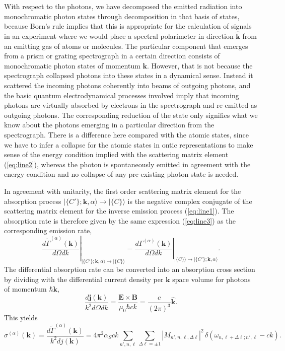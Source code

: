 \documentclass[final,3p,12pt]{elsarticle3}
\begin{document}
With respect to the photons, we have decomposed the emitted radiation into 
monochromatic photon states through decomposition in that basis of states, 
because Born's rule implies that this is appropriate for the calculation 
of signals in an experiment 
where we would place a spectral polarimeter in direction $\hat{\bm{k}}$ from 
an emitting gas of atoms or molecules. The particular component that emerges from 
a prism or grating spectrograph in a certain direction consists of monochromatic 
photon states of momentum $\bm{k}$. However, that is not because the 
spectrograph collapsed photons into these states in a dynamical sense. 
Instead it scattered the incoming photons coherently into beams of outgoing photons, 
and the basic quantum electrodynamical processes involved imply that incoming photons 
are virtually absorbed by electrons in the spectrograph and re-emitted as outgoing 
photons. The corresponding reduction of the state only signifies what we know about 
the photons emerging in a particular direction from the spectrograph.
There is a difference here compared with the atomic states, since we have to
infer a collapse for the atomic states in ontic representations to make
sense of the energy condition implied with the scattering matrix element (\ref{eq:line2}), 
whereas the photon is spontaneously emitted in agreement with the energy 
condition and no collapse of any pre-existing photon state is needed.

In agreement with unitarity, the first order scattering matrix element for the 
absorption process $\bm{|}\{C'\};\bm{k},\alpha\bm{\rangle}\to\bm{|}\{C\}\bm{\rangle}$
is the negative complex conjugate of the scattering matrix element for the 
inverse emission process (\ref{eq:line1}). The absorption rate is therefore 
given by the same expression (\ref{eq:line3}) as the corresponding emission rate,
\[
\left.\frac{d\tilde{\Gamma}^{(\alpha)}(\bm{k})}{d\Omega dk}
\right|_{\bm{|}\{C'\};\bm{k},\alpha\bm{\rangle}\to\bm{|}\{C\}\bm{\rangle}}
=\left.\frac{d\Gamma^{(\alpha)}(\bm{k})}{d\Omega dk}
\right|_{\bm{|}\{C\}\bm{\rangle}\to\bm{|}\{C'\};\bm{k},\alpha\bm{\rangle}}.
\]
The differential absorption rate can be converted into an absorption
cross section by dividing with the differential current
density per $\bm{k}$ space volume for photons of momentum $\hbar\bm{k}$,
\begin{equation}
\frac{d\bm{j}(\bm{k})}{k^2d\Omega dk}
=\frac{\bm{E}\times\bm{B}}{\mu_0\hbar ck}
=\frac{c}{(2\pi)^3}\hat{\bm{k}}.
\end{equation}
This yields
\begin{equation}
\sigma^{(\alpha)}(\bm{k})=\frac{d\tilde{\Gamma}^{(\alpha)}(\bm{k})}{k^2dj(\bm{k})}
=4\pi^2\alpha_S ck
\sum_{n',n,\ell}\sum_{\Delta\ell=\pm 1}
|M_{n',n,\ell,\Delta\ell}|^2
\label{eq:abs3}
\,\delta(\omega_{n,\ell+\Delta\ell;n',\ell}-ck).
\end{equation}
\end{document}

